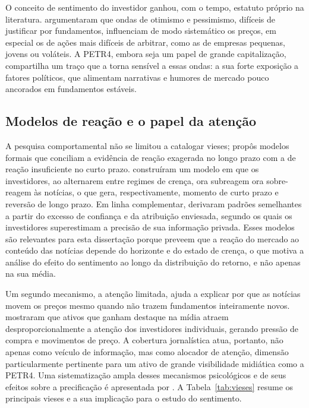 O conceito de sentimento do investidor ganhou, com o tempo, estatuto próprio na literatura.  argumentaram que ondas de otimismo e pessimismo, difíceis de justificar por fundamentos, influenciam de modo sistemático os preços, em especial os de ações mais difíceis de arbitrar, como as de empresas pequenas, jovens ou voláteis. A PETR4, embora seja um papel de grande capitalização, compartilha um traço que a torna sensível a essas ondas: a sua forte exposição a fatores políticos, que alimentam narrativas e humores de mercado pouco ancorados em fundamentos estáveis.

\subsection{Modelos de reação e o papel da atenção}

A pesquisa comportamental não se limitou a catalogar vieses; propôs modelos formais que conciliam a evidência de reação exagerada no longo prazo com a de reação insuficiente no curto prazo.  construíram um modelo em que os investidores, ao alternarem entre regimes de crença, ora subreagem ora sobre-reagem às notícias, o que gera, respectivamente, momento de curto prazo e reversão de longo prazo. Em linha complementar,  derivaram padrões semelhantes a partir do excesso de confiança e da atribuição enviesada, segundo os quais os investidores superestimam a precisão de sua informação privada. Esses modelos são relevantes para esta dissertação porque preveem que a reação do mercado ao conteúdo das notícias depende do horizonte e do estado de crença, o que motiva a análise do efeito do sentimento ao longo da distribuição do retorno, e não apenas na sua média.

Um segundo mecanismo, a atenção limitada, ajuda a explicar por que as notícias movem os preços mesmo quando não trazem fundamentos inteiramente novos.  mostraram que ativos que ganham destaque na mídia atraem desproporcionalmente a atenção dos investidores individuais, gerando pressão de compra e movimentos de preço. A cobertura jornalística atua, portanto, não apenas como veículo de informação, mas como alocador de atenção, dimensão particularmente pertinente para um ativo de grande visibilidade midiática como a PETR4. Uma sistematização ampla desses mecanismos psicológicos e de seus efeitos sobre a precificação é apresentada por . A Tabela~\ref{tab:vieses} resume os principais vieses e a sua implicação para o estudo do sentimento.

